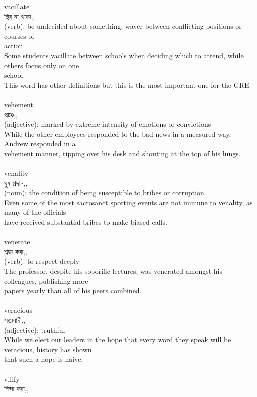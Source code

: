 \documentclass{article}
\begin{document}
{vacillate}\\
{স্থির না থাকা,,}\\
{(verb): be undecided about something; waver between conflicting positions or courses of\\action\\Some students vacillate between schools when deciding which to attend, while others focus only on one\\school.\\This word has other definitions but this is the most important one for the GRE\\}\\
{vehement}\\
{প্রচণ্ড,,}\\
{(adjective): marked by extreme intensity of emotions or convictions\\While the other employees responded to the bad news in a measured way, Andrew responded in a\\vehement manner, tipping over his desk and shouting at the top of his lungs.\\}\\
{venality}\\
{ঘুষ প্রদান,,}\\
{(noun): the condition of being susceptible to bribes or corruption\\Even some of the most sacrosanct sporting events are not immune to venality, as many of the officials\\have received substantial bribes to make biased calls.\\}\\
{venerate}\\
{শ্রদ্ধা করা,,}\\
{(verb): to respect deeply\\The professor, despite his soporific lectures, was venerated amongst his colleagues, publishing more\\papers yearly than all of his peers combined.\\}\\
{veracious}\\
{সত্যবাদী,,}\\
{(adjective): truthful\\While we elect our leaders in the hope that every word they speak will be veracious, history has shown\\that such a hope is naive.\\}\\
{vilify}\\
{নিন্দা করা,,}\\
\end{document}
